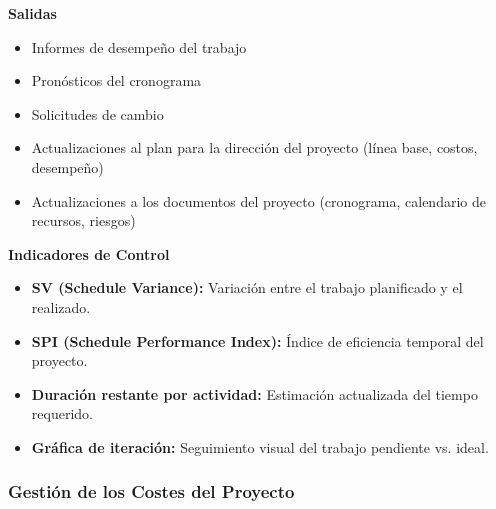\begin{multicols}{2}
    \textbf{Salidas}
    \begin{itemize}
        \item Informes de desempeño del trabajo
        \item Pronósticos del cronograma
        \item Solicitudes de cambio
        \item Actualizaciones al plan para la dirección del proyecto (línea base, costos, desempeño)
        \item Actualizaciones a los documentos del proyecto (cronograma, calendario de recursos, riesgos)
    \end{itemize}

    \textbf{Indicadores de Control}
    \begin{itemize}
        \item \textbf{SV (Schedule Variance):} Variación entre el trabajo planificado y el realizado.
        \item \textbf{SPI (Schedule Performance Index):} Índice de eficiencia temporal del proyecto.
        \item \textbf{Duración restante por actividad:} Estimación actualizada del tiempo requerido.
        \item \textbf{Gráfica de iteración:} Seguimiento visual del trabajo pendiente vs. ideal.
    \end{itemize}

    \end{multicols}

    \subsubsection{Gestión de los Costes del Proyecto}

